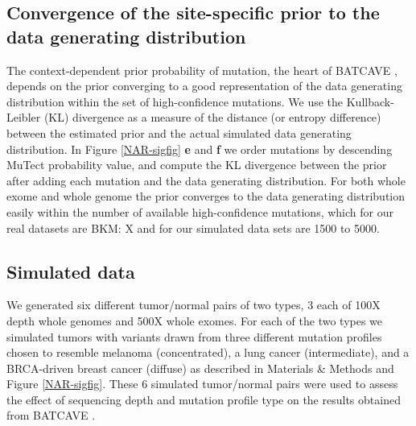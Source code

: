\documentclass[a4,center,fleqn]{NAR}
\newcommand{\bkmcomment}[1]{{\color{blue}BKM: #1}}
\newcommand{\batcave}{BATCAVE }
\begin{document}
\subsection{Convergence of the site-specific prior to the data generating distribution}
The context-dependent prior probability of mutation, the heart of \batcave, depends on the prior converging to a good representation of the data generating distribution within the set of high-confidence mutations.
We use the Kullback-Leibler (KL) divergence as a measure of the distance (or entropy difference) between the estimated prior and the actual simulated data generating distribution.
In Figure \ref{NAR-sigfig} \textbf{e} and \textbf{f} we order mutations by descending MuTect probability value, and compute the KL divergence between the prior after adding each mutation and the data generating distribution.
For both whole exome and whole genome the prior converges to the data generating distribution easily within the number of available high-confidence mutations, which for our real datasets are \bkmcomment{X} and for our simulated data sets are 1500 to 5000.

\subsection{Simulated data}
We generated six different tumor/normal pairs of two types, 3 each of 100X depth whole genomes and 500X whole exomes.
For each of the two types we simulated tumors with variants drawn from three different mutation profiles chosen to resemble melanoma (concentrated), a lung cancer (intermediate), and a BRCA-driven breast cancer (diffuse)  as described in Materials \& Methods and Figure \ref{NAR-sigfig}.
These 6 simulated tumor/normal pairs were used to assess the effect of sequencing depth and mutation profile type on the results obtained from \batcave.
\end{document}
